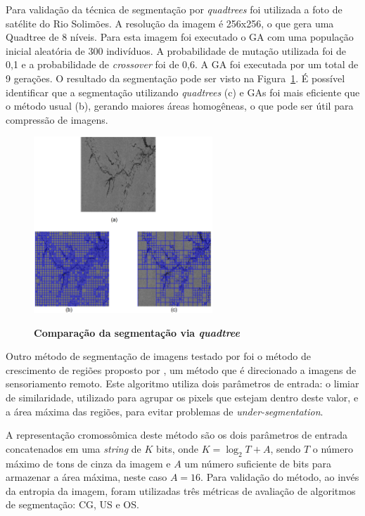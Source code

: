 \documentclass[12pt,oneside,a4paper,english,french,spanish,brazil,]{abntex2}
\begin{document}
Para validação da técnica de segmentação por \textit{quadtrees} foi utilizada a foto de satélite do Rio Solimões. A resolução da imagem é 256x256, o que gera uma Quadtree de 8 níveis. Para esta imagem foi executado o GA com uma população inicial aleatória de 300 indivíduos. A probabilidade de mutação utilizada foi de 0,1 e a probabilidade de \textit{crossover} foi de 0,6. A GA foi executada por um total de 9 gerações. O resultado da segmentação pode ser visto na Figura~\ref{fig:TrCo_Matias_Quadtree_1}. É possível identificar que a segmentação utilizando \textit{quadtrees} (c) e GAs foi mais eficiente que o método usual (b), gerando maiores áreas homogêneas, o que pode ser útil para compressão de imagens.

\begin{figure}[ht]
\centering
\caption{\textbf{Comparação da segmentação via \textit{quadtree}}}
\includegraphics[width=0.6\textwidth]{imagens/TrCo_Matias_Quadtree_1.PNG}
\label{fig:TrCo_Matias_Quadtree_1}
\end{figure}

Outro método de segmentação de imagens testado por \citet{matias:2007} foi o método de crescimento de regiões proposto por \citet{bins:1996}, um método que é direcionado a imagens de sensoriamento remoto. Este algoritmo utiliza dois parâmetros de entrada: o limiar de similaridade, utilizado para agrupar os pixels que estejam dentro deste valor, e a área máxima das regiões, para evitar problemas de \textit{under-segmentation}.


A representação cromossômica deste método são os dois parâmetros de entrada concatenados em uma \textit{string} de \(K\) bits, onde \(K = \log_2 T + A\), sendo \(T\) o número máximo de tons de cinza da imagem e \(A\) um número suficiente de bits para armazenar a área máxima, neste caso \(A = 16\). Para validação do método, ao invés da entropia da imagem, foram utilizadas três métricas de avaliação de algoritmos de segmentação: CG, US e OS.
\end{document}
